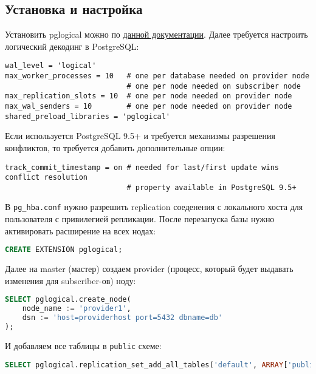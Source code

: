 \subsection{Установка и настройка}


Установить pglogical можно по \href{https://2ndquadrant.com/en/resources/pglogical/pglogical-installation-instructions/}{данной документации}. Далее требуется настроить логический декодинг в PostgreSQL:

\begin{lstlisting}[label=lst:pglogical1,caption=postgresql.conf]
wal_level = 'logical'
max_worker_processes = 10   # one per database needed on provider node
                            # one per node needed on subscriber node
max_replication_slots = 10  # one per node needed on provider node
max_wal_senders = 10        # one per node needed on provider node
shared_preload_libraries = 'pglogical'
\end{lstlisting}

Если используется PostgreSQL 9.5+ и требуется механизмы разрешения конфликтов, то требуется добавить дополнительные опции:

\begin{lstlisting}[label=lst:pglogical2,caption=postgresql.conf]
track_commit_timestamp = on # needed for last/first update wins conflict resolution
                            # property available in PostgreSQL 9.5+
\end{lstlisting}

В \lstinline!pg_hba.conf! нужно разрешить replication соеденения с локального хоста для пользователя с привилегией репликации. После перезапуска базы нужно активировать расширение на всех нодах:

\begin{lstlisting}[label=lst:pglogical3,language=SQL,caption=Активируем расширение]
CREATE EXTENSION pglogical;
\end{lstlisting}

Далее на master (мастер) создаем provider (процесс, который будет выдавать изменения для subscriber-ов) ноду:

\begin{lstlisting}[label=lst:pglogical4,language=SQL,caption=Создаем provider]
SELECT pglogical.create_node(
    node_name := 'provider1',
    dsn := 'host=providerhost port=5432 dbname=db'
);
\end{lstlisting}

И добавляем все таблицы в \lstinline!public! схеме:

\begin{lstlisting}[label=lst:pglogical5,language=SQL,caption=Добавляем в replication set все таблицы в public схеме]
SELECT pglogical.replication_set_add_all_tables('default', ARRAY['public']);
\end{lstlisting}

